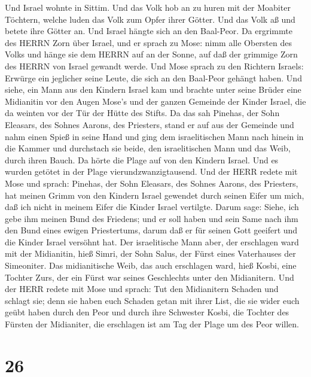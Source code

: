  Und Israel wohnte in Sittim. Und das Volk hob an zu huren
mit der Moabiter Töchtern,  welche luden das Volk zum Opfer
ihrer Götter. Und das Volk aß und betete ihre Götter an. 
Und Israel hängte sich an den Baal-Peor. Da ergrimmte des HERRN Zorn
über Israel,  und er sprach zu Mose: nimm alle Obersten des
Volks und hänge sie dem HERRN auf an der Sonne, auf daß der grimmige
Zorn des HERRN von Israel gewandt werde.  Und Mose sprach zu
den Richtern Israels: Erwürge ein jeglicher seine Leute, die sich an den
Baal-Peor gehängt haben.  Und siehe, ein Mann aus den
Kindern Israel kam und brachte unter seine Brüder eine Midianitin vor
den Augen Mose's und der ganzen Gemeinde der Kinder Israel, die da
weinten vor der Tür der Hütte des Stifts.  Da das sah
Pinehas, der Sohn Eleasars, des Sohnes Aarons, des Priesters, stand er
auf aus der Gemeinde und nahm einen Spieß in seine Hand  und
ging dem israelitischen Mann nach hinein in die Kammer und durchstach
sie beide, den israelitischen Mann und das Weib, durch ihren Bauch. Da
hörte die Plage auf von den Kindern Israel.  Und es wurden
getötet in der Plage vierundzwanzigtausend.  Und der HERR
redete mit Mose und sprach:  Pinehas, der Sohn Eleasars,
des Sohnes Aarons, des Priesters, hat meinen Grimm von den Kindern
Israel gewendet durch seinen Eifer um mich, daß ich nicht in meinem
Eifer die Kinder Israel vertilgte.  Darum sage: Siehe, ich
gebe ihm meinen Bund des Friedens;  und er soll haben und
sein Same nach ihm den Bund eines ewigen Priestertums, darum daß er für
seinen Gott geeifert und die Kinder Israel versöhnt hat. 
Der israelitische Mann aber, der erschlagen ward mit der Midianitin,
hieß Simri, der Sohn Salus, der Fürst eines Vaterhauses der Simeoniter.
 Das midianitische Weib, das auch erschlagen ward, hieß
Kosbi, eine Tochter Zurs, der ein Fürst war seines Geschlechts unter den
Midianitern.  Und der HERR redete mit Mose und sprach:
 Tut den Midianitern Schaden und schlagt sie; 
denn sie haben euch Schaden getan mit ihrer List, die sie wider euch
geübt haben durch den Peor und durch ihre Schwester Kosbi, die Tochter
des Fürsten der Midianiter, die erschlagen ist am Tag der Plage um des
Peor willen.

\hypertarget{section-25}{%
\section{26}\label{section-25}}

